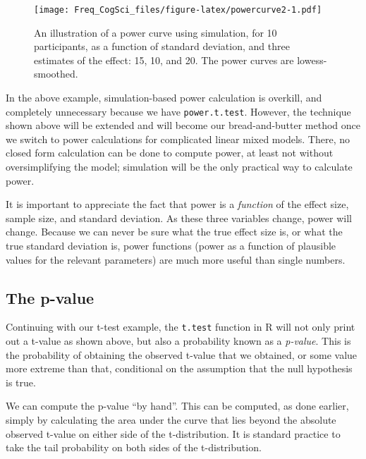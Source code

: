 \documentclass[
  12pt,
]{krantz}
\newenvironment{Shaded}{\begin{snugshade}}{\end{snugshade}}
\newcommand{\AttributeTok}[1]{\textcolor[rgb]{0.77,0.63,0.00}{#1}}
\newcommand{\DecValTok}[1]{\textcolor[rgb]{0.00,0.00,0.81}{#1}}
\newcommand{\FunctionTok}[1]{\textcolor[rgb]{0.00,0.00,0.00}{#1}}
\newcommand{\NormalTok}[1]{#1}
\newcommand{\OtherTok}[1]{\textcolor[rgb]{0.56,0.35,0.01}{#1}}
\newcommand{\SpecialCharTok}[1]{\textcolor[rgb]{0.00,0.00,0.00}{#1}}
\theoremstyle{definition}
\theoremstyle{definition}
\theoremstyle{definition}
\theoremstyle{definition}
\theoremstyle{remark}
\begin{document}
\begin{figure}
\centering
\texttt{[image: Freq\_CogSci\_files/figure-latex/powercurve2-1.pdf]}
\caption{\label{fig:powercurve2}An illustration of a power curve using simulation, for 10 participants, as a function of standard deviation, and three estimates of the effect: 15, 10, and 20. The power curves are lowess-smoothed.}
\end{figure}

In the above example, simulation-based power calculation is overkill, and completely unnecessary because we have \texttt{power.t.test}. However, the technique shown above will be extended and will become our bread-and-butter method once we switch to power calculations for complicated linear mixed models. There, no closed form calculation can be done to compute power, at least not without oversimplifying the model; simulation will be the only practical way to calculate power.

It is important to appreciate the fact that power is a \emph{function} of the effect size, sample size, and standard deviation. As these three variables change, power will change. Because we can never be sure what the true effect size is, or what the true standard deviation is, power functions (power as a function of plausible values for the relevant parameters) are much more useful than single numbers.

\hypertarget{the-p-value}{%
\subsection{The p-value}\label{the-p-value}}

Continuing with our t-test example, the \texttt{t.test} function in R will not only print out a t-value as shown above, but also a probability known as a \emph{p-value}. This is the probability of obtaining the observed t-value that we obtained, or some value more extreme than that, conditional on the assumption that the null hypothesis is true.

We can compute the p-value ``by hand''. This can be computed, as done earlier, simply by calculating the area under the curve that lies beyond the absolute observed t-value on either side of the t-distribution. It is standard practice to take the tail probability on both sides of the t-distribution.

\begin{Shaded}
\end{Shaded}
\end{document}
